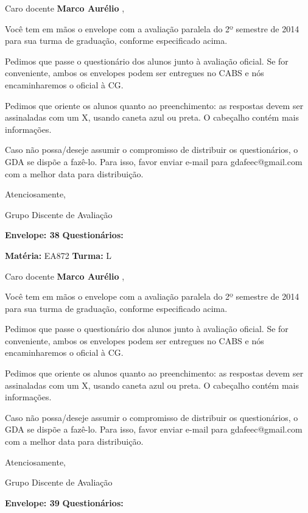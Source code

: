 \documentclass[a5paper]{letter}
\begin{document}
Caro docente {\bf Marco Aurélio }, 

	Você tem em mãos o envelope com a avaliação paralela do 2º semestre de 2014 para sua turma de graduação, conforme especificado acima.

	Pedimos que passe o questionário dos alunos junto à avaliação oficial. Se for conveniente, ambos os envelopes podem ser entregues no CABS e nós encaminharemos o oficial à CG.

Pedimos que oriente os alunos quanto ao preenchimento: as respostas devem ser assinaladas com um X, usando caneta azul ou preta. O cabeçalho contém mais informações.

	Caso não possa/deseje assumir o compromisso de distribuir os questionários, o GDA se dispõe a fazê-lo. Para isso, favor enviar e-mail para gdafeec@gmail.com com a melhor data para distribuição.


Atenciosamente, 

Grupo Discente de Avaliação

\vspace{0.5cm}

{\bf Envelope: 38 }		\hfill	{\bf Questionários:} \hspace{2cm}

\newpage
\thispagestyle{empty}

\hfill {\bf Matéria:} EA872 {\bf Turma:} L

Caro docente {\bf Marco Aurélio }, 

	Você tem em mãos o envelope com a avaliação paralela do 2º semestre de 2014 para sua turma de graduação, conforme especificado acima.

	Pedimos que passe o questionário dos alunos junto à avaliação oficial. Se for conveniente, ambos os envelopes podem ser entregues no CABS e nós encaminharemos o oficial à CG.

Pedimos que oriente os alunos quanto ao preenchimento: as respostas devem ser assinaladas com um X, usando caneta azul ou preta. O cabeçalho contém mais informações.

	Caso não possa/deseje assumir o compromisso de distribuir os questionários, o GDA se dispõe a fazê-lo. Para isso, favor enviar e-mail para gdafeec@gmail.com com a melhor data para distribuição.


Atenciosamente, 

Grupo Discente de Avaliação

\vspace{0.5cm}

{\bf Envelope: 39 }		\hfill	{\bf Questionários:} \hspace{2cm}
\end{document}
